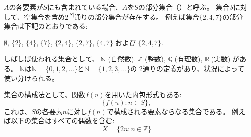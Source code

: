 \begin{comment}
If each element of $A$ also belongs to $S$,
we say that $A$ is a \key{subset} of $S$,
denoted by $A \subset S$.
A set $S$ always has $2^{|S|}$ subsets,
including the empty set.
For example, the subsets of the set $\{2,4,7\}$ are
\begin{center}
$\emptyset$,
$\{2\}$, $\{4\}$, $\{7\}$, $\{2,4\}$, $\{2,7\}$, $\{4,7\}$ and $\{2,4,7\}$.
\end{center}
\end{comment}

$A$の各要素が$S$にも含まれている場合、$A$を$S$の部分集合（）と呼ぶ。
集合$S$に対して、空集合を含め$2^{|S|}$通りの部分集合が存在する。 
例えば集合$\{2,4,7\}$の部分集合は下記のとおりである:
\begin{center}
$\emptyset$,
$\{2\}$, $\{4\}$, $\{7\}$, $\{2,4\}$, $\{2,7\}$, $\{4,7\}$ および $\{2,4,7\}$.
\end{center}

\begin{comment}
Some often used sets are
$\mathbb{N}$ (natural numbers),
$\mathbb{Z}$ (integers),
$\mathbb{Q}$ (rational numbers) and
$\mathbb{R}$ (real numbers).
The set $\mathbb{N}$
can be defined in two ways, depending
on the situation:
either $\mathbb{N}=\{0,1,2,\ldots\}$
or $\mathbb{N}=\{1,2,3,...\}$.
\end{comment}

しばしば使われる集合として、
$\mathbb{N}$ (自然数),
$\mathbb{Z}$ (整数),
$\mathbb{Q}$ (有理数),
$\mathbb{R}$ (実数)
がある。
$\mathbb{N}$は$\mathbb{N}=\{0,1,2,\ldots\}$と$\mathbb{N}=\{1,2,3,\ldots\}$の
2通りの定義があり、状況によって使い分けられる。



\begin{comment}
We can also construct a set using a rule of the form
\[\{f(n) : n \in S\},\]
where $f(n)$ is some function.
This set contains all elements of the form $f(n)$,
where $n$ is an element in $S$.
For example, the set
\[X=\{2n : n \in \mathbb{Z}\}\]
contains all even integers.
\end{comment}

集合の構成法として、関数$f(n)$を用いた内包形式もある:
\[\{f(n) : n \in S\},\]
これは、$S$の各要素$n$に対し$f(n)$で構成される要素ならなる集合である。
例えば以下の集合はすべての偶数を含む:
\[X=\{2n : n \in \mathbb{Z}\}\]


\begin{comment}
\subsubsection{Logic}
\end{comment}

